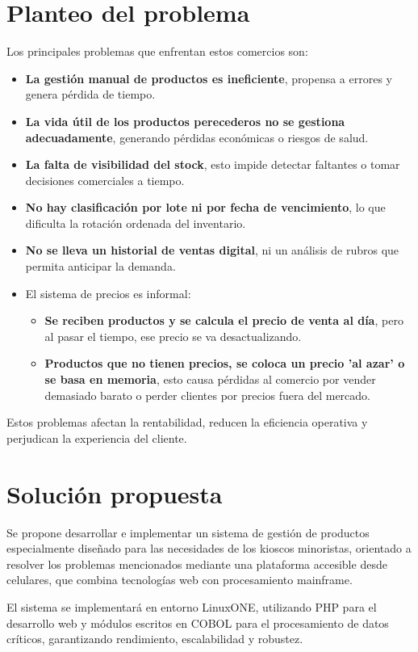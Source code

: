 \documentclass[twoside]{article}
\begin{document}
\section{Planteo del problema}
Los principales problemas que enfrentan estos comercios son:
\begin{itemize}
    \item \textbf{La gestión manual de productos es ineficiente}, propensa a errores y genera pérdida de tiempo.
    \item \textbf{La vida útil de los productos perecederos no se gestiona adecuadamente}, generando pérdidas económicas o riesgos de salud.
    \item \textbf{La falta de visibilidad del stock}, esto impide detectar faltantes o tomar decisiones comerciales a tiempo.
    \item \textbf{No hay clasificación por lote ni por fecha de vencimiento}, lo que dificulta la rotación ordenada del inventario.
    \item \textbf{No se lleva un historial de ventas digital}, ni un análisis de rubros que permita anticipar la demanda.
    \item El sistema de precios es informal:
    \begin{itemize}
        \item \textbf{Se reciben productos y se calcula el precio de venta al día}, pero al pasar el tiempo, ese precio se va desactualizando.
        \item \textbf{Productos que no tienen precios, se coloca un precio 'al azar' o se basa en memoria}, esto causa pérdidas al comercio por vender demasiado barato o perder clientes por precios fuera del mercado.
    \end{itemize}
\end{itemize}
Estos problemas afectan la rentabilidad, reducen la eficiencia operativa y perjudican la experiencia del cliente.

\section{Solución propuesta}
Se propone desarrollar e implementar un sistema de gestión de productos especialmente diseñado para las necesidades de los kioscos minoristas, orientado a resolver los problemas mencionados mediante una plataforma accesible desde celulares, que combina tecnologías web con procesamiento mainframe.\par
El sistema se implementará en entorno LinuxONE, utilizando PHP para el desarrollo web y módulos escritos en COBOL para el procesamiento de datos críticos, garantizando rendimiento, escalabilidad y robustez.
\end{document}
